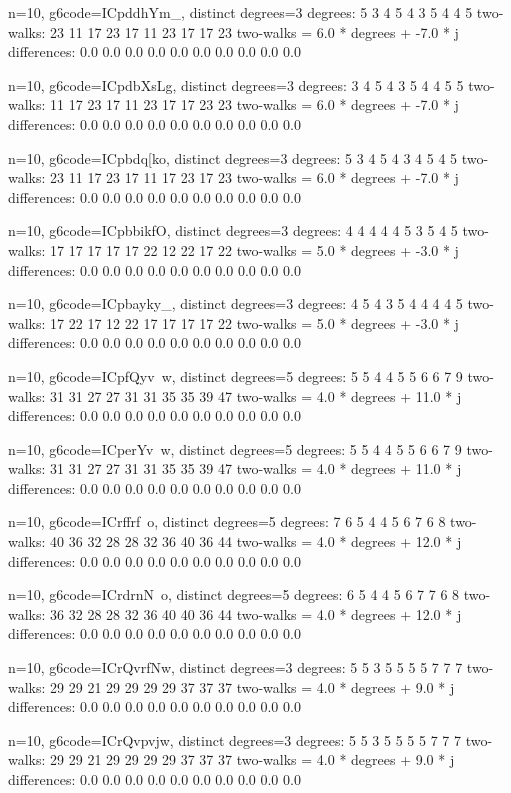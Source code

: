 {{{{{{{{{{{{{{{n=10, g6code=ICpddhYm_, distinct degrees=3
degrees: 5 3 4 5 4 3 5 4 4 5 
two-walks: 23 11 17 23 17 11 23 17 17 23 
two-walks = 6.0 * degrees + -7.0 * j
differences: 0.0 0.0 0.0 0.0 0.0 0.0 0.0 0.0 0.0 0.0 

n=10, g6code=ICpdbXsLg, distinct degrees=3
degrees: 3 4 5 4 3 5 4 4 5 5 
two-walks: 11 17 23 17 11 23 17 17 23 23 
two-walks = 6.0 * degrees + -7.0 * j
differences: 0.0 0.0 0.0 0.0 0.0 0.0 0.0 0.0 0.0 0.0 

n=10, g6code=ICpbdq[ko, distinct degrees=3
degrees: 5 3 4 5 4 3 4 5 4 5 
two-walks: 23 11 17 23 17 11 17 23 17 23 
two-walks = 6.0 * degrees + -7.0 * j
differences: 0.0 0.0 0.0 0.0 0.0 0.0 0.0 0.0 0.0 0.0 

n=10, g6code=ICpbbikfO, distinct degrees=3
degrees: 4 4 4 4 4 5 3 5 4 5 
two-walks: 17 17 17 17 17 22 12 22 17 22 
two-walks = 5.0 * degrees + -3.0 * j
differences: 0.0 0.0 0.0 0.0 0.0 0.0 0.0 0.0 0.0 0.0 

n=10, g6code=ICpbayky_, distinct degrees=3
degrees: 4 5 4 3 5 4 4 4 4 5 
two-walks: 17 22 17 12 22 17 17 17 17 22 
two-walks = 5.0 * degrees + -3.0 * j
differences: 0.0 0.0 0.0 0.0 0.0 0.0 0.0 0.0 0.0 0.0 

n=10, g6code=ICpfQyv~w, distinct degrees=5
degrees: 5 5 4 4 5 5 6 6 7 9 
two-walks: 31 31 27 27 31 31 35 35 39 47 
two-walks = 4.0 * degrees + 11.0 * j
differences: 0.0 0.0 0.0 0.0 0.0 0.0 0.0 0.0 0.0 0.0 

n=10, g6code=ICperYv~w, distinct degrees=5
degrees: 5 5 4 4 5 5 6 6 7 9 
two-walks: 31 31 27 27 31 31 35 35 39 47 
two-walks = 4.0 * degrees + 11.0 * j
differences: 0.0 0.0 0.0 0.0 0.0 0.0 0.0 0.0 0.0 0.0 

n=10, g6code=ICrffrf~o, distinct degrees=5
degrees: 7 6 5 4 4 5 6 7 6 8 
two-walks: 40 36 32 28 28 32 36 40 36 44 
two-walks = 4.0 * degrees + 12.0 * j
differences: 0.0 0.0 0.0 0.0 0.0 0.0 0.0 0.0 0.0 0.0 

n=10, g6code=ICrdrnN~o, distinct degrees=5
degrees: 6 5 4 4 5 6 7 7 6 8 
two-walks: 36 32 28 28 32 36 40 40 36 44 
two-walks = 4.0 * degrees + 12.0 * j
differences: 0.0 0.0 0.0 0.0 0.0 0.0 0.0 0.0 0.0 0.0 

n=10, g6code=ICrQvrfNw, distinct degrees=3
degrees: 5 5 3 5 5 5 5 7 7 7 
two-walks: 29 29 21 29 29 29 29 37 37 37 
two-walks = 4.0 * degrees + 9.0 * j
differences: 0.0 0.0 0.0 0.0 0.0 0.0 0.0 0.0 0.0 0.0 

n=10, g6code=ICrQvpvjw, distinct degrees=3
degrees: 5 5 3 5 5 5 5 7 7 7 
two-walks: 29 29 21 29 29 29 29 37 37 37 
two-walks = 4.0 * degrees + 9.0 * j
differences: 0.0 0.0 0.0 0.0 0.0 0.0 0.0 0.0 0.0 0.0 

}}}}}}}}}}}}}}}
